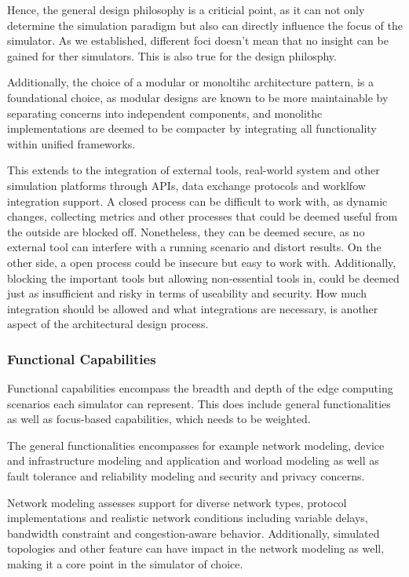 Hence, the general design philosophy is a criticial point, as it can not only determine the simulation paradigm but also can directly influence the focus of the simulator.
As we established, different foci doesn't mean that no insight can be gained for ther simulators. This is also true for the design philosphy.

Additionally, the choice of a modular or monoltihc architecture pattern, is a foundational choice, as modular designs are known to be more maintainable by separating concerns into independent components, and 
monolithc implementations are deemed to be compacter by integrating all functionality within unified frameworks.

This extends to the integration of external tools, real-world system and other simulation platforms through APIs, data exchange protocols and worklfow integration support.
A closed process can be difficult to work with, as dynamic changes, collecting metrics and other processes that could be deemed useful from the outside are blocked off.
Nonetheless, they can be deemed secure, as no external tool can interfere with a running scenario and distort results.
On the other side, a open process could be insecure but easy to work with.
Additionally, blocking the important tools but allowing non-essential tools in, could be deemed just as insufficient and risky in terms of useability and security.
How much integration should be allowed and what integrations are necessary, is another aspect of the architectural design process.

\subsubsection{Functional Capabilities}
Functional capabilities encompass the breadth and depth of the edge computing scenarios each simulator can represent.
This does include general functionalities as well as focus-based capabilities, which needs to be weighted.

The general functionalities encompasses for example network modeling, device and infrastructure modeling and application and worload modeling as well as fault tolerance and reliability modeling and security and privacy concerns.

Network modeling assesses support for diverse network types, protocol implementations and realistic network conditions including variable delays, bandwidth constraint and congestion-aware behavior.
Additionally, simulated topologies and other feature can have impact in the network modeling as well, making it a core point in the simulator of choice.

